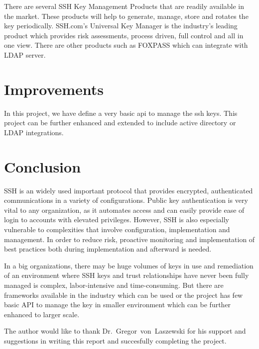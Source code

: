 There are several SSH Key Management Products that are readily available
in the market. These products will help to generate, manage, store and
rotates the key periodically. SSH.com's Universal Key Manager is the
industry's leading product which provides risk assessments, process driven,
full control and all in one view. There are other products such as 
FOXPASS which can integrate with LDAP server.

\section{Improvements}

In this project, we have define a very basic api to manage the ssh keys.
This project can be further enhanced and extended to include active directory 
or LDAP integrations.


\section{Conclusion}

SSH is an widely used important protocol that provides encrypted, 
authenticated communications in a variety of configurations. Public key
authentication is very vital to any organization, as it automates 
access and can easily provide ease of login to accounts with elevated 
privileges. However, SSH is also especially vulnerable to complexities
that involve configuration, implementation and management. In order to
reduce risk, proactive monitoring and implementation of best practices 
both during implementation and afterward is needed. 

In a big organizations, there may be huge volumes of keys in use and
remediation of an environment where SSH keys and trust relationships 
have never been fully managed is complex, labor-intensive and 
time-consuming. But there are frameworks available in the industry which 
can be used or the project has few basic API to manage the key in smaller 
environment which can be further enhanced to larger scale.


\begin{acks}
The author would like to thank Dr.~Gregor~von~Laszewski for his support and 
suggestions in writing this report and succesfully completing the project.
\end{acks}










